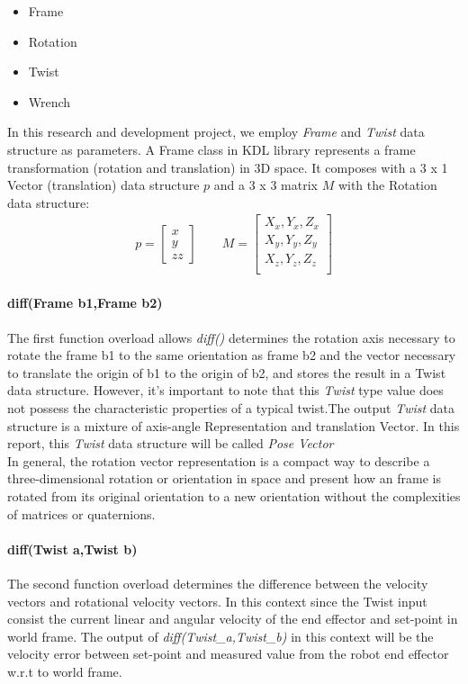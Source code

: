 \documentclass[report.tex]{subfiles}
\begin{document}
    \begin{itemize}
        \item Frame 
        \item Rotation 
        \item Twist 
        \item Wrench 
    \end{itemize}
    In this research and development project, we employ \textit{Frame} and \textit{Twist} data structure as parameters.
    A Frame class in KDL library represents a frame transformation (rotation and translation) in 3D space. It composes with a 3 x 1 Vector (translation) data structure $p$ and a 3 x 3 matrix $M$ with the Rotation data structure:
    \begin{align}
        p = \begin{bmatrix}
            x\\y\\zz
        \end{bmatrix} \qquad
        M = \begin{bmatrix}
            X_x,Y_x,Z_x\\
            X_y,Y_y,Z_y\\
            X_z,Y_z,Z_z\\
        \end{bmatrix} 
    \end{align}
    \paragraph{\large{diff(Frame b1,Frame b2)}\\} \label{diff_frame}
    The first function overload allows \textit{diff()} determines the rotation axis necessary to rotate the frame b1 to the same orientation as frame b2 and the vector necessary to translate the origin of b1 to the origin of b2, and stores the result in a Twist data structure. However, it's important to note that this \textit{Twist} type value does not possess the characteristic properties of a typical twist.The output \textit{Twist} data structure is a mixture of axis-angle Representation and translation Vector. In this report, this \textit{Twist} data structure will be called \textit{Pose Vector} \\
    In general, the rotation vector representation is a compact way to describe a three-dimensional rotation or orientation in space and present how an frame is rotated from its original orientation to a new orientation without the complexities of matrices or quaternions. 
    \paragraph{\large{diff(Twist a,Twist b)}\\}
    The second function overload determines the difference between the velocity vectors and rotational velocity vectors. In this context since the Twist input consist the current linear and angular velocity of the end effector and set-point in world frame. The output of \textit{diff(Twist\_a,Twist\_b)} in this context will be the velocity error between set-point and measured value from the robot end effector w.r.t to world frame.
\end{document}

